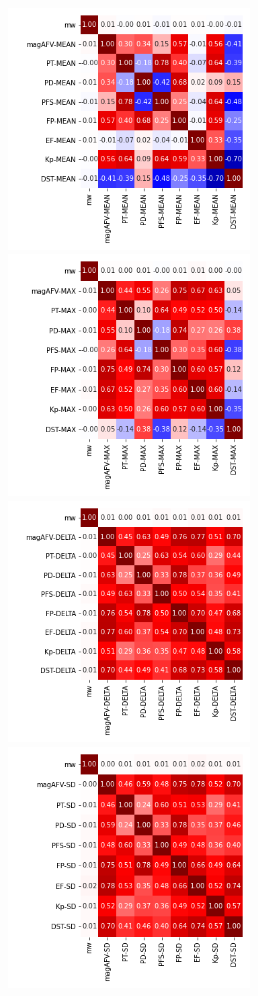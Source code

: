 \documentclass[12pt]{article}
\begin{document}
\newpage

\begin{figure}
   \includegraphics[width=0.57\textwidth]{six-seven_mean_1.png}
   \includegraphics[width=0.57\textwidth]{six-seven_max_1.png}
   \includegraphics[width=0.57\textwidth]{six-seven_delta_1.png}
   \includegraphics[width=0.57\textwidth]{six-seven_sd_1.png}
\end{figure}
\end{document}
